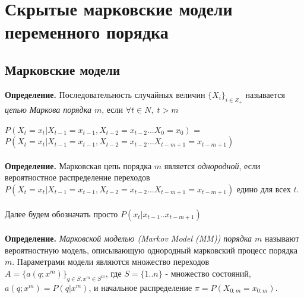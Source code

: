 \documentclass{matmex-diploma-custom}
\begin{document}
\section{Скрытые марковские модели переменного порядка}
\subsection{Марковские модели}
\textbf{Определение.} Последовательность случайных величин $ \{X_{i}\}_{i \in Z_{+}}$ называется \emph{цепью Маркова порядка $ m $}, если $ \forall t\in N, \;t>m $

$ P(X_{t} = x_{t}|X_{t-1}=x_{t-1},X_{t-2}=x_{t-2} ... X_{0}=x_{0})$ = 
$ P(X_{t} = x_{t}|X_{t-1}=x_{t-1},X_{t-2}=x_{t-2} ... X_{t-m+1}=x_{t-m+1}) $ 
\\\\
\textbf{Определение.} Марковская цепь порядка $ m $ является \textit{однородной}, если вероятностное распределение переходов $P(X_{t} = x_{t}|X_{t-1}=x_{t-1},X_{t-2}=x_{t-2} ... X_{t-m+1}=x_{t-m+1})$ едино для всех $ t $.
\\\\
Далее будем обозначать просто $ P(x_{t}|x_{t-1}..x_{t-m+1})$
\\\\

\textbf{Определение.} \emph{Марковской моделью (Markov Model (MM)) порядка $ m $} называют вероятностную модель, описывающую однородный марковский процесс порядка $ m $.
Параметрами модели являются множество переходов $ A = \{a(q; x^{m})\}_{q \in S, x^{m} \in S^{m}}$, где $ S = \{1..n\} $ - множество состояний, $a(q; x^{m}) = P(q|x^{m})$, и начальное распределение $ \pi = P(X_{0:m}=x_{0:m})$. 
\\\\
\end{document}
